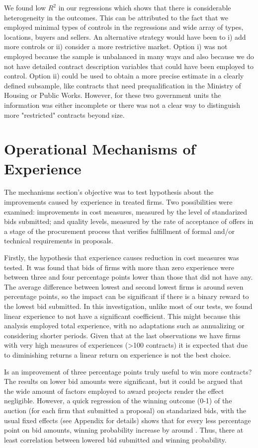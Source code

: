 We found low $R^2$ in our regressions which shows that there is considerable heterogeneity in the outcomes. This can be attributed to the fact that we employed minimal types of controls in the regressions and wide array of types, locations, buyers and sellers. An alternative strategy would have been to i) add more controls or ii) consider a more restrictive market. Option i) was not employed because the sample is unbalanced in many ways and also because we do not have detailed contract description variables that could have been employed to control. Option ii) could be used to obtain a more precise estimate in a clearly defined subsample, like contracts that need prequalification in the Ministry of Housing or Public Works. However, for these two government units the information was either incomplete or there was not a clear way to distinguish more "restricted" contracts beyond size.

\section{Operational Mechanisms of Experience}

The mechanisms section's objective was to test hypothesis about the improvements caused by experience in treated firms. Two possibilities were examined: improvements in cost measures, measured by the level of standarized bids submitted; and  quality levels, measured by the rate of acceptance of offers in a stage of the procurement process that verifies fulfillment of formal and/or technical requirements in proposals.

Firstly, the hypothesis that experience causes reduction in cost measures was tested. It was found that bids of firms with more than zero experience were between three and four percentage points lower than those that did not have any. The average difference between lowest and second lowest firms is around seven percentage points, so the impact can be significant if there is a binary reward to the lowest bid submitted. In this investigation, unlike most of our tests, we found linear experience to not have a significant coefficient. This might because this analysis employed total experience, with no adaptations such as annualizing or considering shorter periods. Given that at the last observations we have firms with very high measures of experiences (>100 contracts) it is expected that due to diminishing returns a linear return on experience is not the best choice.

Is an improvement of three percentage points truly useful to win more contracts? The results on lower bid amounts were significant, but it could be argued that the wide amount of factors employed to award projects render the effect negligible. However, a quick regression of the winning outcome (0-1) of the auction (for each firm that submitted a proposal) on standarized bids, with the usual fixed effects (see Appendix for details) shows that for every less percentage point on bid amounts, winning probability increase by around . Thus, there at least correlation between lowered bid submitted and winning probability.

